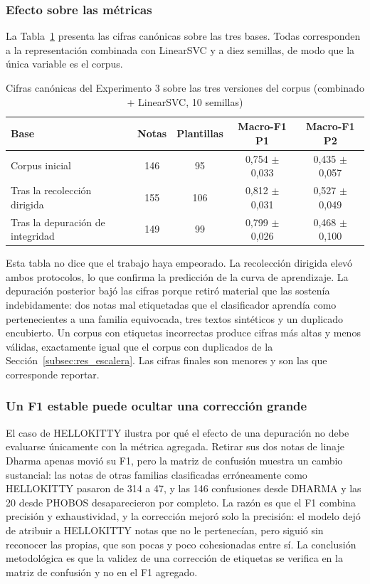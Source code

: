 \subsubsection*{Efecto sobre las métricas}

La Tabla~\ref{tab:tres_bases} presenta las cifras canónicas sobre las tres bases. Todas corresponden a la representación combinada con LinearSVC y a diez semillas, de modo que la única variable es el corpus.

\begin{table}[ht]
\centering
\caption{Cifras canónicas del Experimento 3 sobre las tres versiones del corpus (combinado + LinearSVC, 10 semillas)}
\label{tab:tres_bases}
\begin{tabular}{|l|c|c|c|c|}
\hline
\textbf{Base} & \textbf{Notas} & \textbf{Plantillas} & \textbf{Macro-F1 P1} & \textbf{Macro-F1 P2} \\
\hline
Corpus inicial & 146 & 95 & 0,754 $\pm$ 0,033 & 0,435 $\pm$ 0,057 \\
Tras la recolección dirigida & 155 & 106 & 0,812 $\pm$ 0,031 & 0,527 $\pm$ 0,049 \\
Tras la depuración de integridad & 149 & 99 & 0,799 $\pm$ 0,026 & 0,468 $\pm$ 0,100 \\
\hline
\end{tabular}
\end{table}

Esta tabla no dice que el trabajo haya empeorado. La recolección dirigida elevó ambos protocolos, lo que confirma la predicción de la curva de aprendizaje. La depuración posterior bajó las cifras porque retiró material que las sostenía indebidamente: dos notas mal etiquetadas que el clasificador aprendía como pertenecientes a una familia equivocada, tres textos sintéticos y un duplicado encubierto. Un corpus con etiquetas incorrectas produce cifras más altas y menos válidas, exactamente igual que el corpus con duplicados de la Sección~\ref{subsec:res_escalera}. Las cifras finales son menores y son las que corresponde reportar.

\subsubsection*{Un F1 estable puede ocultar una corrección grande}

El caso de HELLOKITTY ilustra por qué el efecto de una depuración no debe evaluarse únicamente con la métrica agregada. Retirar sus dos notas de linaje Dharma apenas movió su F1, pero la matriz de confusión muestra un cambio sustancial: las notas de otras familias clasificadas erróneamente como HELLOKITTY pasaron de 314 a 47, y las 146 confusiones desde DHARMA y las 20 desde PHOBOS desaparecieron por completo. La razón es que el F1 combina precisión y exhaustividad, y la corrección mejoró solo la precisión: el modelo dejó de atribuir a HELLOKITTY notas que no le pertenecían, pero siguió sin reconocer las propias, que son pocas y poco cohesionadas entre sí. La conclusión metodológica es que la validez de una corrección de etiquetas se verifica en la matriz de confusión y no en el F1 agregado.

